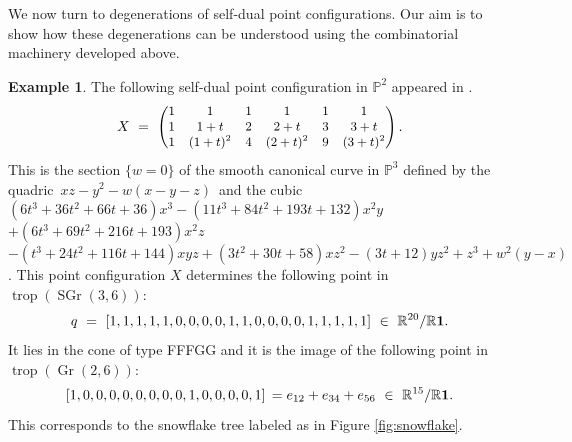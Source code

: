 \documentclass[12pt]{extarticle}
\theoremstyle{definition}
\newtheorem{example}[theorem]{Example}
\numberwithin{theorem}{section}
\theoremstyle{plain}\newtheorem{ithm}{Theorem}
\newcommand{\PP}{\mathbb{P}}
\newcommand{\RR}{\mathbb{R}}
\DeclareMathOperator{\trop}{trop}
\DeclareMathOperator{\SGr}{SGr}
\DeclareMathOperator{\Gr}{Gr}
\begin{document}
We now turn to degenerations of self-dual point configurations. Our aim is to show
how these degenerations can be understood using the combinatorial machinery developed above.

\begin{example}
  The following self-dual point configuration in  $\PP^2$ appeared in  \cite[Example~1]{AFMS}.
    \begin{align}\label{eq:pts} 
    X \,\, = \,\, \begin{small}
    \begin{pmatrix}
      1 & 1 & 1 & 1 & 1 & 1 \\
      1 & 1+t & 2 & 2+t & 3 & 3+t\\
      1 & (1+t)^2& 4 &(2+t)^2 & 9 & (3+t)^2
    \end{pmatrix}. \end{small}
  \end{align}
This is the section $\{w=0\}$ of the smooth canonical curve in $\PP^3$ defined by
the quadric $\,xz - y^2-w(x-y-z) \,$ and the cubic 
$ (6t^3 {+} 36t^2 {+} 66t {+} 36)x^3 - (11t^3 {+} 84t^2 {+} 193t {+} 132)x^2y $ $
    + (6t^3 {+} 69t^2 {+} 216t {+} 193)x^2z  $ $
- (t^3 {+} 24t^2 {+} 116t {+} 144)xyz + (3t^2 {+} 30t {+} 58)xz^2 - (3t {+} 12)yz^2 + z^3+w^2(y-x)$.
    This point configuration $X$ determines the following point in $\trop(\SGr(3,6))$:
  \begin{equation}
  q\,\,=\,\,  [1,1,1,1,1,0,0,0,0,1,1,0,0,0,0,1,1,1,1,1] \,\, \in \,\,\RR^{20} / \RR {\bf 1}. \label{eq:ptsgrass}
  \end{equation}
  It lies in the cone of type FFFGG and it is the image of the
  following point in   $\trop(\Gr(2,6))$:
  $$[1,0,0,0,0,0,0,0,0,1,0,0,0,0,1] \, = e_{12} + e_{34} + e_{56} \,\,\in \,\,\RR^{15}/\RR {\bf 1}.$$
  This corresponds to the snowflake tree
  labeled  as in Figure \ref{fig:snowflake}.


\end{example}
\end{document}
